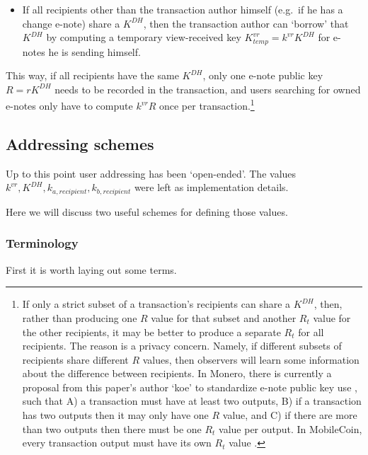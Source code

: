 \begin{itemize}
\begin{itemize}
        \item If all recipients other than the transaction author himself (e.g.\ if he has a change e-note) share a $K^{DH}$, then the transaction author can `borrow' that $K^{DH}$ by computing a temporary view-received key $K^{vr}_{temp} = k^{vr} K^{DH}$ for e-notes he is sending himself.
    \end{itemize}

    This way, if all recipients have the same $K^{DH}$, only one e-note public key $R = r K^{DH}$ needs to be recorded in the transaction, and users searching for owned e-notes only have to compute $k^{vr} R$ once per transaction.\footnote{If only a strict subset of a transaction's recipients can share a $K^{DH}$, then, rather than producing one $R$ value for that subset and another $R_t$ value for the other recipients, it may be better to produce a separate $R_t$ for all recipients. The reason is a privacy concern. Namely, if different subsets of recipients share different $R$ values, then observers will learn some information about the difference between recipients. In Monero, there is currently a proposal from this paper's author `koe' to standardize e-note public key use \cite{update-tx-supplement-proposal-monero}, such that A) a transaction must have at least two outputs, B) if a transaction has two outputs then it may only have one $R$ value, and C) if there are more than two outputs then there must be one $R_t$ value per output. In MobileCoin, every transaction output must have its own $R_t$ value \cite{mom-1}.}
\end{itemize}


\subsection{Addressing schemes}
\label{subsec:implementers-addressing-schemes}

Up to this point user addressing has been `open-ended'. The values $k^{vr}, K^{DH}, k_{a,recipient}, k_{b,recipient}$ were left as implementation details.

Here we will discuss two useful schemes for defining those values.

\subsubsection{Terminology}

First it is worth laying out some terms.

